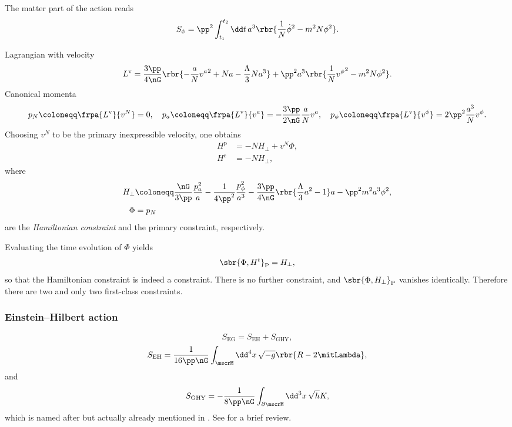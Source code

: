 \documentclass[a4paper,11pt]{article}
\begin{document}
The matter part of the action reads
\begin{equation}
S_\phi = \pp^2 \int_{t_1}^{t_2}\dd t\,
a^3 \rbr{\frac{1}{N}\dot{\phi}^2 - m^2N\phi^2}.
\end{equation}

Lagrangian with velocity
\begin{equation}
L^\text{v} = \frac{3\pp}{4\nG}\rbr{-\frac{a}{N} {v^a}^2 + Na - 
\frac{\Lambda}{3} Na^3} + \pp^2 a^3 \rbr{\frac{1}{N}{v^\phi}^2 - m^2 N 
\phi^2}.
\end{equation}
Canonical momenta
\begin{equation}
p_N \coloneqq \frpa{L^\text{v}}{v^N} = 0,\quad
p_a \coloneqq \frpa{L^\text{v}}{v^a} = -\frac{3\pp}{2\nG} \frac{a}{N} v^a,\quad
p_\phi \coloneqq \frpa{L^\text{v}}{v^\phi} = 2\pp^2 \frac{a^3}{N} v^\phi.
\end{equation}
Choosing $v^N$ to be the primary inexpressible velocity, one obtains
\begin{align}
H^\text{p} &= -N H_\perp + v^N \Phi, \\
H^\text{c} &= -N H_\perp,
\end{align}
where
\begin{align}
H_\perp &\coloneqq \frac{\nG}{3\pp} \frac{p_a^2}{a}  - \frac{1}{4\pp^2} 
\frac{p_\phi^2}{a^3}  - \frac{3\pp}{4\nG}\rbr{\frac{\Lambda}{3}a^2 - 1}a
- \pp^2 m^2 a^3 \phi^2, \\
\Phi &= p_N
\end{align}
are the \emph{Hamiltonian constraint} and the primary constraint, respectively.

Evaluating the time evolution of $\Phi$ yields
\begin{equation}
\sbr{\Phi,H^t}_\text{P} = H_\perp,
\end{equation}
so that the Hamiltonian constraint is indeed a constraint. There is no further 
constraint, and $\sbr{\Phi, H_\perp}_\text{P}$ vanishes identically. Therefore 
there are two and only two first-class constraints.





\subsubsection{Einstein--Hilbert action}

\begin{equation}
S_\text{EG} = S_\text{EH} + S_\text{GHY},
\label{eq:action-einstein-gravity}
\end{equation}
\begin{equation}
S_\text{EH} = \frac{1}{16\pp\nG}\int_\mscrM\dd^4 x\,\sqrt{-g} 
\rbr{R-2\mitLambda},
\end{equation}
and
\begin{equation}
S_\text{GHY} = -\frac{1}{8\pp\nG}\int_{\partial\mscrM}\dd^3 x\,\sqrt{h} K,
\end{equation}
which is named after \cite{Gibbons1977,York1972} but actually already mentioned 
in \cite{Einstein1916}. See \cite{Dyer2009} for a brief review.


\printbibliography
\end{document}
